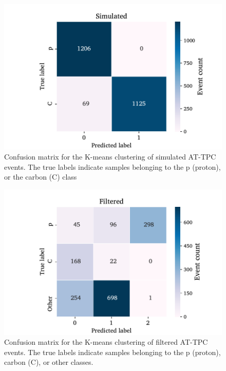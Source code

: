 \documentclass[review,number,sort&compress]{elsarticle}
\begin{document}
\begin{figure}
\centering
	\includegraphics[width=\textwidth]{custom_work/Simulatedvgg_conf_mat.pdf} 
	\caption[Pre-trained network - confusion matrices]{Confusion matrix for the K-means clustering of simulated AT-TPC events. The true labels indicate samples belonging to the p (proton), or the carbon (C) class}\label{fig:clster_confmat_sim}
\end{figure}

\begin{figure}
\centering
	\includegraphics[width=\textwidth]{custom_work/Filteredvgg_conf_mat.pdf}
	\caption[Pre-trained network - confusion matrices]{Confusion matrix for the K-means clustering of filtered AT-TPC events. The true labels indicate samples belonging to the p (proton), carbon (C), or other classes. }\label{fig:clster_confmati_filt}
\end{figure}
\end{document}
